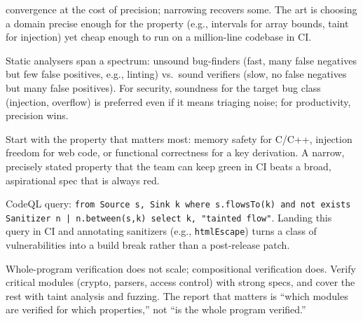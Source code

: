  convergence at the cost of precision; narrowing recovers some. The art is choosing a domain precise enough for the property (e.g., intervals for array bounds, taint for injection) yet cheap enough to run on a million-line codebase in CI.

\begin{remark}
Static analysers span a spectrum: unsound bug-finders (fast, many false negatives but few false positives, e.g., linting) vs.\ sound verifiers (slow, no false negatives but many false positives). For security, soundness for the target bug class (injection, overflow) is preferred even if it means triaging noise; for productivity, precision wins.
\end{remark}


\begin{remark}
Start with the property that matters most: memory safety for C/C++, injection freedom for web code, or functional correctness for a key derivation. A narrow, precisely stated property that the team can keep green in CI beats a broad, aspirational spec that is always red.
\end{remark}


\begin{example}[Taint in CI]
CodeQL query: \texttt{from Source s, Sink k where s.flowsTo(k) and not exists Sanitizer n | n.between(s,k) select k, "tainted flow"}. Landing this query in CI and annotating sanitizers (e.g., \texttt{htmlEscape}) turns a class of vulnerabilities into a build break rather than a post-release patch.
\end{example}


\begin{remark}
Whole-program verification does not scale; compositional verification does. Verify critical modules (crypto, parsers, access control) with strong specs, and cover the rest with taint analysis and fuzzing. The report that matters is ``which modules are verified for which properties,'' not ``is the whole program verified.''
\end{remark}

